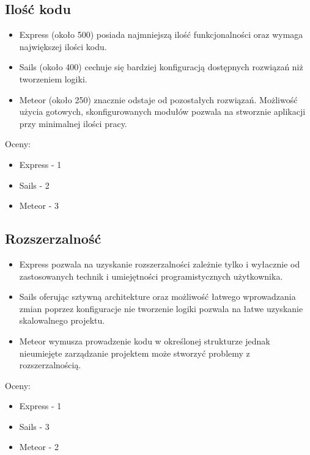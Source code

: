 \documentclass[12pt]{report}
\begin{document}
    \subsection{Ilość kodu}
      \begin{itemize}
        \item Express (około 500) posiada najmniejszą ilość funkcjonalności oraz wymaga największej ilości kodu.
        \item Sails (około 400) cechuje się bardziej konfiguracją dostępnych rozwiązań niż tworzeniem logiki. 
        \item Meteor (około 250) znacznie odstaje od pozostałych rozwiązań. Możliwość użycia gotowych, skonfigurowanych modułów pozwala na stworznie aplikacji przy minimalnej ilości pracy.
      \end{itemize}
      Oceny:
      \begin{itemize}
        \item Express - 1
        \item Sails - 2
        \item Meteor - 3
      \end{itemize}
      
    \subsection{Rozszerzalność}
      \begin{itemize}
        \item Express pozwala na uzyskanie rozszerzalności zależnie tylko i wyłacznie od zastosowanych technik i umiejętności programistycznych użytkownika.
        \item Sails oferując sztywną architekture oraz możliwość łatwego wprowadzania zmian poprzez konfiguracje nie tworzenie logiki pozwala na łatwe uzyskanie skalowalnego projektu.
        \item Meteor wymusza prowadzenie kodu w określonej strukturze jednak nieumiejęte zarządzanie projektem może stworzyć problemy z rozszerzalnością.
      \end{itemize}
      Oceny:
      \begin{itemize}
        \item Express - 1
        \item Sails - 3
        \item Meteor - 2
      \end{itemize}
\end{document}
